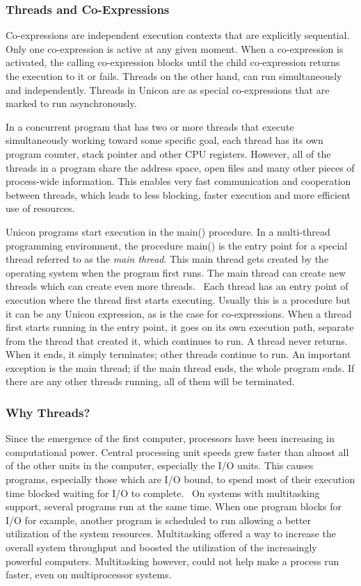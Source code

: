\subsubsection[Threads and Co{}-Expressions ]{Threads and Co-Expressions}

Co-expressions are independent execution contexts that are explicitly
sequential. Only one co-expression is active at any given moment. When
a co-expression is activated, the calling co-expression blocks until
the child co-expression returns the execution to it or fails. Threads
on the other hand, can run simultaneously and independently. Threads
in Unicon are as special co-expressions that are marked to run
asynchronously.

In a concurrent
program that has two or more threads that execute simultaneously
working toward some specific goal, each thread has its own program
counter, stack pointer and other CPU registers. However, all of the
threads in a program share the address space, open files and many other
pieces of process-wide information. This enables very fast
communication and cooperation between threads, which leads to less
blocking, faster execution and more efficient use of resources. 

Unicon programs start execution in the {\textsf main()} procedure. In a
multi-thread programming environment, the procedure {\textsf main()} is
the entry point for a special thread referred to as the
{\em main thread}. This main thread
gets created by the operating system when the program first runs. The
main thread can create new threads which can create even more threads.
\ Each thread has an entry point of execution where the thread first
starts executing. Usually this is a procedure but it can be any Unicon
expression, as is the case for co-expressions. When a thread first
starts running in the entry point, it goes on its own execution path,
separate from the thread that created it, which continues to run. A
thread never returns. When it ends, it simply terminates; other threads
continue to run. An important exception is the main thread; if the main
thread ends, the whole program ends. If there are any other threads
running, all of them will be terminated. 

\subsubsection[Why Threads?]{Why Threads?}

Since the emergence of the first computer, processors have been
increasing in computational power. Central processing unit speeds grew
faster than almost all of the other units in the computer, especially
the I/O units. This causes programs, especially those which are I/O
bound, to spend most of their execution time blocked waiting for I/O to
complete. \ On systems with multitasking support, several programs run
at the same time. When one program blocks for I/O for example, another
program is scheduled to run allowing a better utilization of the system
resources. Multitasking offered a way to increase the overall system
throughput and boosted the utilization of the increasingly powerful
computers. Multitasking however, could not help make a process run
faster, even on multiprocessor systems.

